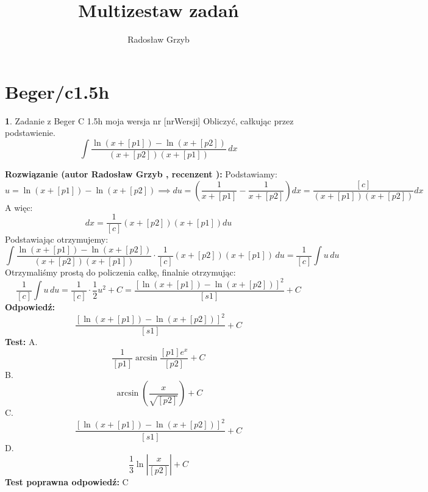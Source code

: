\documentclass[12pt, a4paper]{article}
\title{Multizestaw zadań}
\author{Radosław Grzyb}
\date{}
\theoremstyle{definition} %
\newtheorem{zad}{}
\newcommand{\kategoria}[1]{\section{#1}} %
\newcommand{\zadStart}[1]{\begin{zad}#1\newline} %
\newcommand{\zadStop}{\end{zad}}   %
\newcommand{\rozwStart}[2]{\noindent \textbf{Rozwiązanie (autor #1 , recenzent #2): }\newline} %
\newcommand{\rozwStop}{\newline}                                            %
\newcommand{\odpStart}{\noindent \textbf{Odpowiedź:}\newline}    %
\newcommand{\odpStop}{\newline}                                             %
\newcommand{\testStart}{\noindent \textbf{Test:}\newline} %
\newcommand{\testStop}{\newline} %
\newcommand{\kluczStart}{\noindent \textbf{Test poprawna odpowiedź:}\newline} %
\newcommand{\kluczStop}{\newline} %
\begin{document}
\maketitle
\kategoria{Beger/c1.5h}
\zadStart{Zadanie z Beger C 1.5h moja wersja nr [nrWersji]}
Obliczyć, całkując przez podstawienie.
$$\int \frac{\ln(x+[p1])-\ln(x+[p2])}{(x+[p2])(x+[p1])} \,dx$$
\zadStop
\rozwStart{Radosław Grzyb}{}
Podstawiamy:
$$u=\ln(x+[p1])-\ln(x+[p2]) \implies du=(\frac{1}{x+[p1]}-\frac{1}{x+[p2]})dx = \frac{[c]}{(x+[p1])(x+[p2])}dx$$
A więc:
$$dx=\frac{1}{[c]}(x+[p2])(x+[p1])du$$
Podstawiając otrzymujemy:
$$\int \frac{\ln(x+[p1])-\ln(x+[p2])}{(x+[p2])(x+[p1])}\cdot\frac{1}{[c]}(x+[p2])(x+[p1]) \,du=\frac{1}{[c]}\int u \,du$$
Otrzymaliśmy prostą do policzenia całkę, finalnie otrzymując:
$$\frac{1}{[c]}\int u \,du=\frac{1}{[c]}\cdot\frac{1}{2}u^2+C=\frac{[\ln(x+[p1])-\ln(x+[p2])]^2}{[s1]}+C$$
\rozwStop
\odpStart
$$\frac{[\ln(x+[p1])-\ln(x+[p2])]^2}{[s1]}+C$$
\odpStop
\testStart
A.$$\frac{1}{[p1]}\arcsin\frac{[p1]e^{x}}{[p2]}+C$$
B.$$\arcsin(\frac{x}{\sqrt{[p2]}})+C$$
C.$$\frac{[\ln(x+[p1])-\ln(x+[p2])]^2}{[s1]}+C$$
D.$$\frac{1}{3}\ln|\frac{x}{[p2]}|+C$$
\testStop
\kluczStart
C
\kluczStop
\end{document}
